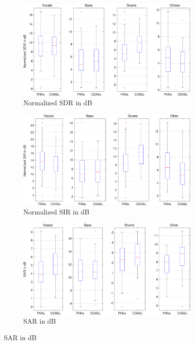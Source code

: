 \documentclass{article}
\begin{document}
\begin{figure}
\centering
   \begin{subfigure}[b]{0.43\textwidth}
   \includegraphics[width=0.99\linewidth]{avr2_sdr_interspeech2017.eps} 
   \caption{Normalized SDR in dB}\hfill \hfill\hfill\hfill\hfill\hfill
   \label{fig:dnn1} 
\end{subfigure}

\begin{subfigure}[b]{0.43\textwidth}
   \includegraphics[width=0.99\linewidth]{avr2_sir_interspeech2017.eps} 
   \caption{Normalized SIR in dB}\hfill\hfill\hfill\hfill\hfill\hfill 
   \label{fig:dnn2}
\end{subfigure}

\begin{subfigure}[b]{0.43\textwidth}
   \includegraphics[width=0.99\linewidth]{avr2_sar_interspeech2017.eps}
   \caption{SAR in dB}\hfill\hfill
   \label{fig:dnn3} 
\end{subfigure}


\end{figure}
\end{document}
